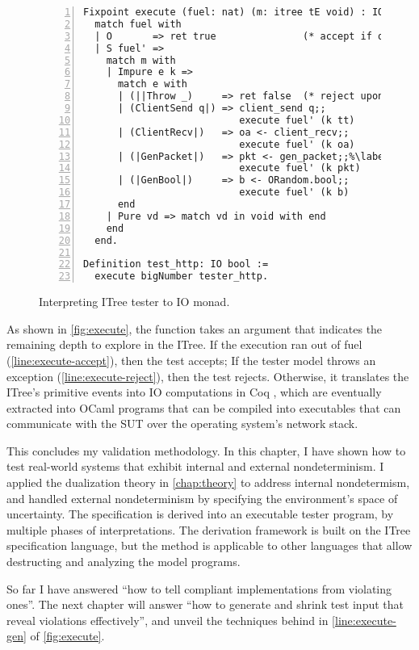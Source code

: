 \begin{figure}
\begin{lstlisting}[numbers=left]
Fixpoint execute (fuel: nat) (m: itree tE void) : IO bool :=
  match fuel with
  | O       => ret true               (* accept if out of fuel *)%\label{line:execute-accept}%
  | S fuel' =>
    match m with
    | Impure e k =>
      match e with
      | (||Throw _)     => ret false  (* reject upon exception *)%\label{line:execute-reject}%
      | (ClientSend q|) => client_send q;;
                           execute fuel' (k tt)
      | (ClientRecv|)   => oa <- client_recv;;
                           execute fuel' (k oa)
      | (|GenPacket|)   => pkt <- gen_packet;;%\label{line:execute-gen}%
                           execute fuel' (k pkt)
      | (|GenBool|)     => b <- ORandom.bool;;
                           execute fuel' (k b)
      end
    | Pure vd => match vd in void with end
    end
  end.

Definition test_http: IO bool :=
  execute bigNumber tester_http.
\end{lstlisting}
\caption{Interpreting ITree tester to IO monad.}
\label{fig:execute}
\end{figure}

As shown in \autoref{fig:execute}, the  function takes an
argument  that indicates the remaining depth to explore in the ITree.
If the execution ran out of fuel (\autoref{line:execute-accept}), then the test
accepts; If the tester model throws an exception
(\autoref{line:execute-reject}), then the test rejects.  Otherwise, it
translates the ITree's primitive events into IO computations in Coq , which are eventually extracted into OCaml programs
that can be compiled into executables that can communicate with the SUT over the
operating system's network stack.

This concludes my validation methodology.  In this chapter, I have shown how to
test real-world systems that exhibit internal and external nondeterminism.  I
applied the dualization theory in \autoref{chap:theory} to address internal
nondetermism, and handled external nondeterminism by specifying the
environment's space of uncertainty.  The specification is derived into an
executable tester program, by multiple phases of interpretations.  The
derivation framework is built on the ITree specification language, but the
method is applicable to other languages that allow destructing and analyzing the
model programs.

So far I have answered ``how to tell compliant implementations from violating
ones''.  The next chapter will answer ``how to generate and shrink test input
that reveal violations effectively'', and unveil the techniques behind
 in \autoref{line:execute-gen} of \autoref{fig:execute}.
